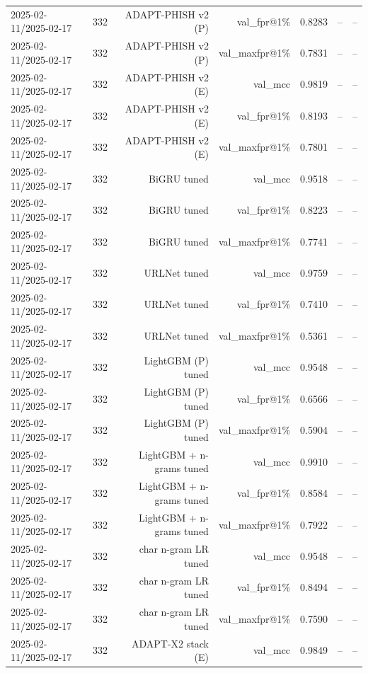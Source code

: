 \begin{table}[t]
\begin{tabular}{llrrrrr}
2025-02-11/2025-02-17 & 332 & ADAPT-PHISH v2 (P) & val\_fpr@1\% & 0.8283 & -- & -- \\
2025-02-11/2025-02-17 & 332 & ADAPT-PHISH v2 (P) & val\_maxfpr@1\% & 0.7831 & -- & -- \\
2025-02-11/2025-02-17 & 332 & ADAPT-PHISH v2 (E) & val\_mcc & 0.9819 & -- & -- \\
2025-02-11/2025-02-17 & 332 & ADAPT-PHISH v2 (E) & val\_fpr@1\% & 0.8193 & -- & -- \\
2025-02-11/2025-02-17 & 332 & ADAPT-PHISH v2 (E) & val\_maxfpr@1\% & 0.7801 & -- & -- \\
2025-02-11/2025-02-17 & 332 & BiGRU tuned & val\_mcc & 0.9518 & -- & -- \\
2025-02-11/2025-02-17 & 332 & BiGRU tuned & val\_fpr@1\% & 0.8223 & -- & -- \\
2025-02-11/2025-02-17 & 332 & BiGRU tuned & val\_maxfpr@1\% & 0.7741 & -- & -- \\
2025-02-11/2025-02-17 & 332 & URLNet tuned & val\_mcc & 0.9759 & -- & -- \\
2025-02-11/2025-02-17 & 332 & URLNet tuned & val\_fpr@1\% & 0.7410 & -- & -- \\
2025-02-11/2025-02-17 & 332 & URLNet tuned & val\_maxfpr@1\% & 0.5361 & -- & -- \\
2025-02-11/2025-02-17 & 332 & LightGBM (P) tuned & val\_mcc & 0.9548 & -- & -- \\
2025-02-11/2025-02-17 & 332 & LightGBM (P) tuned & val\_fpr@1\% & 0.6566 & -- & -- \\
2025-02-11/2025-02-17 & 332 & LightGBM (P) tuned & val\_maxfpr@1\% & 0.5904 & -- & -- \\
2025-02-11/2025-02-17 & 332 & LightGBM + n-grams tuned & val\_mcc & 0.9910 & -- & -- \\
2025-02-11/2025-02-17 & 332 & LightGBM + n-grams tuned & val\_fpr@1\% & 0.8584 & -- & -- \\
2025-02-11/2025-02-17 & 332 & LightGBM + n-grams tuned & val\_maxfpr@1\% & 0.7922 & -- & -- \\
2025-02-11/2025-02-17 & 332 & char n-gram LR tuned & val\_mcc & 0.9548 & -- & -- \\
2025-02-11/2025-02-17 & 332 & char n-gram LR tuned & val\_fpr@1\% & 0.8494 & -- & -- \\
2025-02-11/2025-02-17 & 332 & char n-gram LR tuned & val\_maxfpr@1\% & 0.7590 & -- & -- \\
2025-02-11/2025-02-17 & 332 & ADAPT-X2 stack (E) & val\_mcc & 0.9849 & -- & -- \\

\end{tabular}
\end{table}
